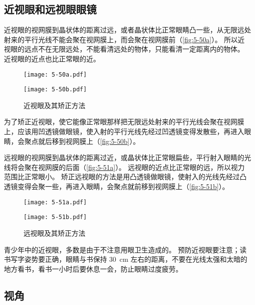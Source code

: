 \subsection{近视眼和远视眼\texorpdfstring{\quad}{ }眼镜}

近视眼的视网膜到晶状体的距离过远，或者晶状体比正常眼睛凸一些，从无限远处射来的平行光线不能会聚在视网膜上，而会聚在视网膜前（\cref{fig:5-50a}）。
所以近视眼的远点不在无限远处，不能看清远处的物体，只能看清一定距离内的物体。
近视眼的近点也比正常眼的近。
\begin{figure}
  \begin{minipage}{0.45\linewidth}\centering
    \texttt{[image: 5-50a.pdf]}
    \subcaption{}\label{fig:5-50a}
  \end{minipage}
  \begin{minipage}{0.45\linewidth}\centering
    \texttt{[image: 5-50b.pdf]}
    \subcaption{}\label{fig:5-50b}
  \end{minipage}
  \caption{近视眼及其矫正方法}\label{fig:5-50}
\end{figure}

为了矫正近视眼，使它能像正常眼那样把无限远处射来的平行光线会聚在视网膜上，应该用凹透镜做眼镜，使入射的平行光线先经过凹透镜变得发散些，再进入眼睛，会聚点就后移到视网膜上（\cref{fig:5-50b}）。

远视眼的视网膜到晶状体的距离过近，或晶状体比正常眼扁些，平行射入眼睛的光线将会聚在视网膜的后面（\cref{fig:5-51a}）。
远视眼的近点比正常眼的远，所以视力范围比正常眼小。
矫正远视眼的方法是用凸透镜做眼镜，使射入的光线先经过凸透镜变得会聚一些，再进入眼睛，会聚点就前移到视网膜上（\cref{fig:5-51b}）。

\begin{figure}
  \begin{minipage}{0.45\linewidth}\centering
    \texttt{[image: 5-51a.pdf]}
    \subcaption{}\label{fig:5-51a}
  \end{minipage}
  \begin{minipage}{0.45\linewidth}\centering
    \texttt{[image: 5-51b.pdf]}
    \subcaption{}\label{fig:5-51b}
  \end{minipage}
  \caption{远视眼及其矫正方法}\label{fig:5-51}
\end{figure}

青少年中的近视眼，多数是由于不注意用眼卫生造成的。
预防近视眼要注意；读书写字姿势要正确，眼睛与书保持 \qty{30}{cm} 左右的距离，不要在光线太强和太暗的地方看书，看书一小时后要休息一会，防止眼睛过度疲劳。

\subsection{视角}


